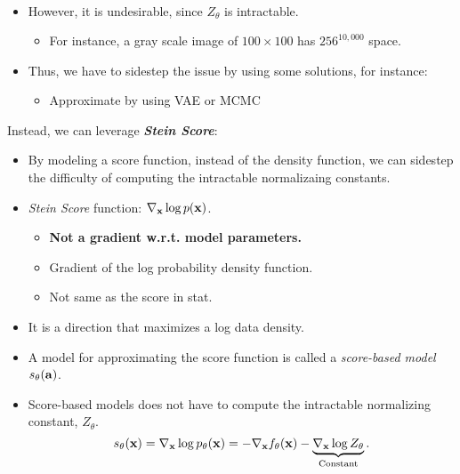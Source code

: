 \begin{itemize}
\begin{align*}
		\end{align*}
	\item However, it is undesirable, since $Z_\theta$ is intractable.
		\begin{itemize}
			\item For instance, a gray scale image of $100\times 100$ has $256^{10,000}$ space. 
		\end{itemize}
	\item Thus, we have to sidestep the issue by using some solutions, for instance:
		\begin{itemize}
			\item Approximate by using VAE or MCMC
		\end{itemize}
\end{itemize}

Instead, we can leverage \textbf{\textit{Stein Score}}: 
\begin{itemize}
	\item By modeling a score function, instead of the density function, we can sidestep the difficulty of computing the intractable normalizaing constants.
	\item \textit{Stein Score} function: $\nabla_{\mathbf{x}}\log p({\mathbf{x}})$.
		\begin{itemize}
			\item \textbf{Not a gradient w.r.t. model parameters.}
			\item Gradient of the log probability density function.
			\item Not same as the score in stat.
		\end{itemize}
	\item It is a direction that maximizes a log data density.
	\item A model for approximating the score function is called a \textit{score-based model} $s_\theta({\mathbf{a}})$.
	\item Score-based models does not have to compute the intractable normalizing constant, $Z_\theta$.
		$$s_\theta({\mathbf{x}}) = \nabla_{\mathbf{x}}\log p_\theta({\mathbf{x}}) = -\nabla_{\mathbf{x}} f_{\theta}({\mathbf{x}})- \underbrace{\nabla_{\mathbf{x}} \log Z_\theta}_{\text{Constant}}.$$
	\end{itemize}

